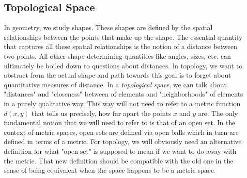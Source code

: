 










\subsection{Topological Space}
In geometry, we study shapes. These shapes are defined by the spatial relationships between the points that make up the shape. The essential quantity that captures all these spatial relationships is the notion of a distance between two points. All other shape-determining quantities like angles, sizes, etc. can ultimately be boiled down to questions about distances. In topology, we want to abstract from the actual shape and path towards this goal is to forget about quantitative measures of distance. In a \emph{topological space}, we can talk about "distances" and "closeness" between of elements and "neighborhoods" of elements in a purely qualitative way. This way will not need to refer to a metric function $d(x,y)$ that tells us precisely, how far apart the points $x$ and $y$ are. The only fundamental notion that we will need to refer to is that of an open set. In the context of metric spaces, open sets are defined via open balls which in turn are defined in terms of a metric. For topology, we will obviously need an alternative definition for what "open set" is supposed to mean if we want to do away with the metric. That new definition should be compatible with the old one in the sense of being equivalent when the space happens to be a metric space.

